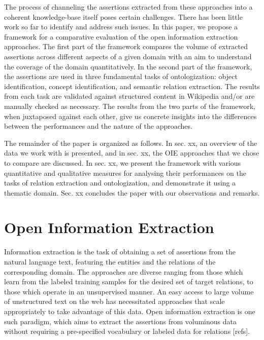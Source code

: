 \documentclass{llncs}
\begin{document}
The process of channeling the assertions extracted from these approaches into a coherent knowledge-base itself poses certain challenges. There has been little work so far to identify and address such issues. In this paper, we propose a framework for a comparative evaluation of the open information extraction approaches. The first part of the framework compares the volume of extracted assertions across different aspects of a given domain with an aim to understand the coverage of the domain quantitatively. In the second part of the framework, the assertions are used in three fundamental tasks of ontologization: object identification, concept identification, and semantic relation extraction. The results from each task are validated against structured content in Wikipedia and/or are manually checked as necessary. The results from the two parts of the framework, when juxtaposed against each other, give us concrete insights into the differences between the performances and the nature of the approaches.

The remainder of the paper is organized as follows. In sec. xx,  an overview of the data we work with is presented, and in sec. xx, the OIE approaches that we chose to compare are discussed. In sec. xx, we present the framework with various quantitative and qualitative measures for analysing their performances on the tasks of relation extraction and ontologization, and demonstrate it using a thematic domain. Sec. xx concludes the paper with our observations and remarks.

\section{Open Information Extraction}
\label{sec:oie}
Information extraction is the task of obtaining a set of assertions from the natural language text, featuring the entities and the relations of the corresponding domain. The approaches are diverse ranging from those which learn from the labeled training samples for the desired set of target relations, to those which operate in an unsupervised manner. An easy access to large volume of unstructured text on the web has necessitated approaches that scale appropriately to take advantage of this data. Open information extraction is one such paradigm, which aims to extract the assertions from voluminous data without requiring a pre-specified vocabulary or labeled data for relations [refs].
\end{document}
